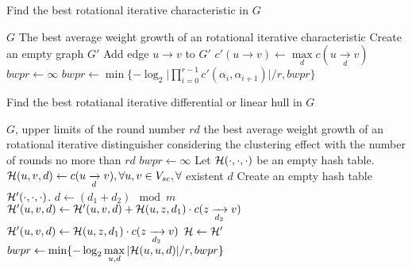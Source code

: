 \begin{algorithm}[htbp]
	\caption{Find the best rotational iterative characteristic in $G$}
	\label{algo:find-ite-c-equiv}
	\begin{algorithmic}[1]
        \Require $G$
        \Ensure The best average weight growth of an rotational iterative characteristic
        \Procedure {}{}
        \State Create an empty graph $G'$
        \State Add edge $u\rightarrow v$ to $G'$
        \State $c'(u\rightarrow v)\leftarrow \max\limits_d c(u\xrightarrow[d]{} v)$
        \EndFor
        \State $bwpr\leftarrow\infty$
        \State $bwpr\leftarrow\min\{-\log_2\Big|\prod\limits_{i=0}^{r-1}c'(\alpha_i,\alpha_{i+1})\Big|/r,bwpr\}$        
        \EndFor
	\EndProcedure
	\end{algorithmic}
\end{algorithm}

\begin{algorithm}[htbp]
	\caption{Find the best rotatianal iterative differential or linear hull in $G$}
	\label{algo:find-ite-h-equiv}
	\begin{algorithmic}[1]
        \Require $G$, upper limits of the round number $rd$
        \Ensure the best average weight growth of an rotational iterative distinguisher considering the clustering effect with the number of rounds no more than $rd$
        \Procedure {}{}
        \State $bwpr\leftarrow\infty$
        \State Let $\mathcal{H}(\cdot,\cdot,\cdot)$ be an empty hash table. 
        \State $\mathcal{H}(u,v,d)\leftarrow c(u\xrightarrow[d]{} v),\forall u,v\in V_{sc},\forall$ existent $d$
        \State Create an empty hash table $\mathcal{H}'(\cdot,\cdot,\cdot)$.
        \State $d\leftarrow (d_1+d_2)\mod m$
        \State $\mathcal{H}'(u,v,d)\leftarrow\mathcal{H}'(u,v,d)+\mathcal{H}(u,z,d_1)\cdot c(z\xrightarrow[d_2]{} v)$
        \Else
        \State $\mathcal{H}'(u,v,d)\leftarrow\mathcal{H}(u,z,d_1)\cdot c(z\xrightarrow[d_2]{} v)$
        \EndIf
        \EndFor
        \State $\mathcal{H}\leftarrow \mathcal{H}'$
        \EndFor
        \State $bwpr\leftarrow \min\{-\log_2\max\limits_{u,d}|\mathcal{H}(u,u,d)|/r,bwpr\}$
        \EndFor
        \EndFor
        \EndProcedure
	\end{algorithmic}
\end{algorithm}

